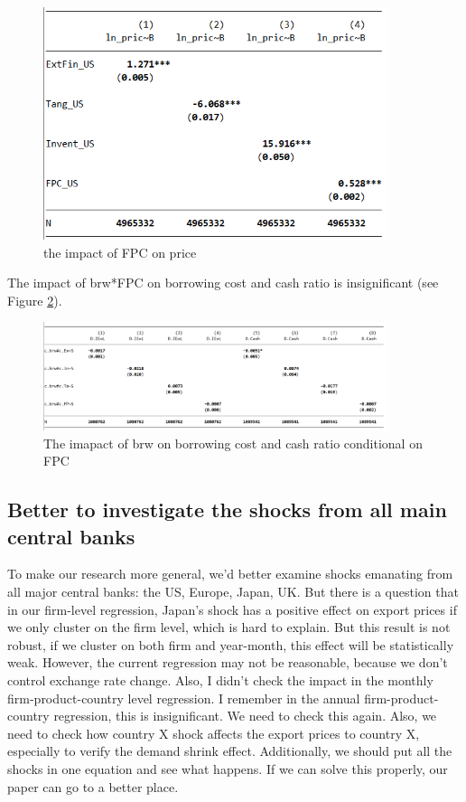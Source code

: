 \documentclass[12pt]{article}
\begin{document}
\begin{figure}
     \centering
         \includegraphics[width=0.9\textwidth]{latex/2023.10/Picture/FPC_price.png}
         \caption{the impact of FPC on price}
         \label{fig: FPC_price}
\end{figure}

The impact of brw*FPC on borrowing cost and cash ratio is insignificant (see Figure \ref{fig: IEOL_Cash_FPC}).

\begin{figure}
     \centering
         \includegraphics[width=0.9\textwidth]{latex/2023.10/Picture/IEOL_Cash_FPC.png}
         \caption{The imapact of brw on borrowing cost and cash ratio conditional on FPC}
         \label{fig: IEOL_Cash_FPC}
\end{figure}

\subsection{Better to investigate the shocks from all main central banks}

To make our research more general, we'd better examine shocks emanating from all major central banks: the US, Europe, Japan, UK. But there is a question that in our firm-level regression, Japan's shock has a positive effect on export prices if we only cluster on the firm level, which is hard to explain. But this result is not robust, if we cluster on both firm and year-month, this effect will be statistically weak. However, the current regression may not be reasonable, because we don't control exchange rate change. Also, I didn't check the impact in the monthly firm-product-country level regression. I remember in the annual firm-product-country regression, this is insignificant. We need to check this again. Also, we need to check how country X shock affects the export prices to country X, especially to verify the demand shrink effect. Additionally, we should put all the shocks in one equation and see what happens. If we can solve this properly, our paper can go to a better place.
\end{document}
